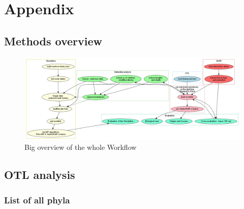 \chapter{Appendix}
  \section{Methods overview}
    \begin{figure}[h!]
      \centering
      \includegraphics[width=\textwidth]{Figures/Workflow.png}
      \caption{Big overview of the whole Workflow}
      \label{fig:BigWorkflow}
    \end{figure}

  \section{OTL analysis}\label{sec:otl analysis}

    \subsection{List of all phyla}\label{subsec:listPhyla}


